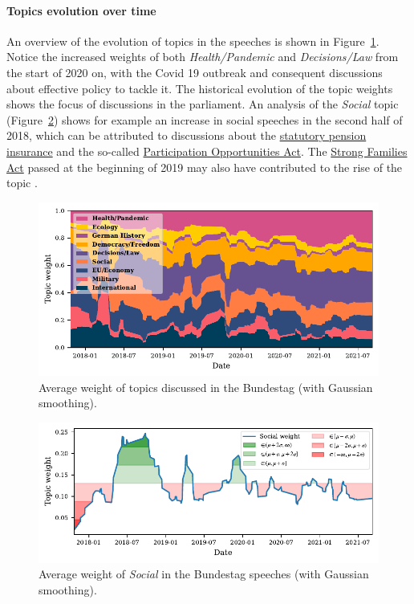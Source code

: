 \documentclass{article}
\begin{document}
\paragraph{Topics evolution over time}
An overview of the evolution of topics in the speeches is shown in Figure~\ref{stacked_area_plot}.
Notice the increased weights of both \textit{Health/Pandemic} and \textit{Decisions/Law} from the start of 2020 on, with the Covid 19 outbreak and consequent discussions about effective policy to tackle it.
The historical evolution of the topic weights shows the focus of discussions in the parliament.
An analysis of the \textit{Social} topic (Figure~\ref{social_topic_plot}) shows for example an increase in social speeches in the second half of 2018, which can be attributed to discussions about the \href{https://dserver.bundestag.de/btd/19/054/1905412.pdf}{statutory pension insurance} and the so-called \href{https://dserver.bundestag.de/btd/19/047/1904725.pdf}{Participation Opportunities Act}. 
The \href{https://dserver.bundestag.de/btd/19/075/1907504.pdf}{Strong Families Act} passed at the beginning of 2019 may also have contributed to the rise of the topic \cite{Bundestag2018}\cite{Bundestag2019}.

\begin{figure}
  \centering
  \includegraphics[width=0.9\linewidth]{images/stacked_area_plot.pdf}
  \captionsetup{width=0.9\linewidth}
  \caption{
    Average weight of topics discussed in the Bundestag (with Gaussian smoothing).
  }
  \label{stacked_area_plot}
\end{figure}

\begin{figure}
  \centering
  \includegraphics[width=0.9\linewidth]{images/Social.pdf}
  \captionsetup{width=0.9\linewidth}
  \caption{
    Average weight of \textit{Social} in the Bundestag speeches (with Gaussian smoothing).
  }
  \label{social_topic_plot}
\end{figure}
\end{document}
